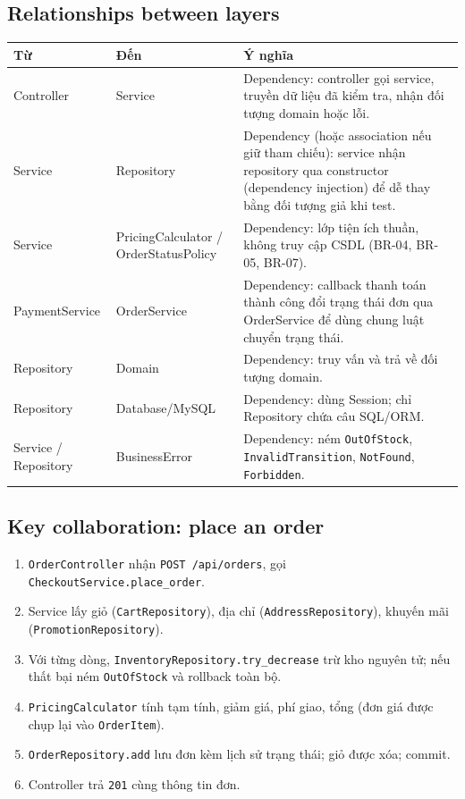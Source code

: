 \documentclass[12pt,a4paper,oneside]{report}
\begin{document}
\subsection{Relationships between layers}
\begin{longtable}{@{}p{3.6cm}p{3.2cm}p{8.4cm}@{}}\toprule Từ & Đến & Ý nghĩa\\\midrule\endhead
Controller & Service & Dependency: controller gọi service, truyền dữ liệu đã kiểm tra, nhận đối tượng domain hoặc lỗi.\\\midrule
Service & Repository & Dependency (hoặc association nếu giữ tham chiếu): service nhận repository qua constructor (dependency injection) để dễ thay bằng đối tượng giả khi test.\\\midrule
Service & PricingCalculator / OrderStatusPolicy & Dependency: lớp tiện ích thuần, không truy cập CSDL (BR-04, BR-05, BR-07).\\\midrule
PaymentService & OrderService & Dependency: callback thanh toán thành công đổi trạng thái đơn qua OrderService để dùng chung luật chuyển trạng thái.\\\midrule
Repository & Domain & Dependency: truy vấn và trả về đối tượng domain.\\\midrule
Repository & Database/MySQL & Dependency: dùng Session; chỉ Repository chứa câu SQL/ORM.\\\midrule
Service / Repository & BusinessError & Dependency: ném \texttt{OutOfStock}, \texttt{InvalidTransition}, \texttt{NotFound}, \texttt{Forbidden}.\\\midrule
\bottomrule\end{longtable}
\subsection{Key collaboration: place an order}
\begin{enumerate}\item \texttt{OrderController} nhận \texttt{POST /api/orders}, gọi \texttt{CheckoutService.place\_order}.\item Service lấy giỏ (\texttt{CartRepository}), địa chỉ (\texttt{AddressRepository}), khuyến mãi (\texttt{PromotionRepository}).\item Với từng dòng, \texttt{InventoryRepository.try\_decrease} trừ kho nguyên tử; nếu thất bại ném \texttt{OutOfStock} và rollback toàn bộ.\item \texttt{PricingCalculator} tính tạm tính, giảm giá, phí giao, tổng (đơn giá được chụp lại vào \texttt{OrderItem}).\item \texttt{OrderRepository.add} lưu đơn kèm lịch sử trạng thái; giỏ được xóa; commit.\item Controller trả \texttt{201} cùng thông tin đơn.\end{enumerate}
\end{document}
